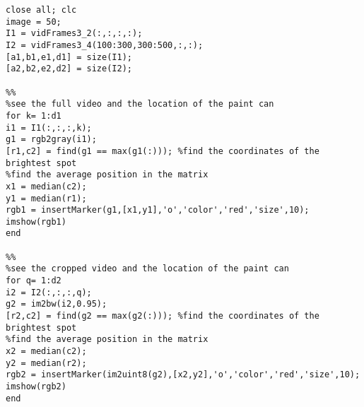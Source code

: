 \documentclass[]{article}
\begin{document}
\begin{verbatim}
close all; clc
image = 50;
I1 = vidFrames3_2(:,:,:,:);
I2 = vidFrames3_4(100:300,300:500,:,:);
[a1,b1,e1,d1] = size(I1);
[a2,b2,e2,d2] = size(I2);

%%
%see the full video and the location of the paint can
for k= 1:d1
i1 = I1(:,:,:,k);
g1 = rgb2gray(i1);
[r1,c2] = find(g1 == max(g1(:))); %find the coordinates of the brightest spot
%find the average position in the matrix
x1 = median(c2);
y1 = median(r1);
rgb1 = insertMarker(g1,[x1,y1],'o','color','red','size',10);
imshow(rgb1)
end

%% 
%see the cropped video and the location of the paint can
for q= 1:d2
i2 = I2(:,:,:,q);
g2 = im2bw(i2,0.95);
[r2,c2] = find(g2 == max(g2(:))); %find the coordinates of the brightest spot
%find the average position in the matrix
x2 = median(c2);
y2 = median(r2);
rgb2 = insertMarker(im2uint8(g2),[x2,y2],'o','color','red','size',10);
imshow(rgb2)
end

\end{verbatim}
\end{document}

